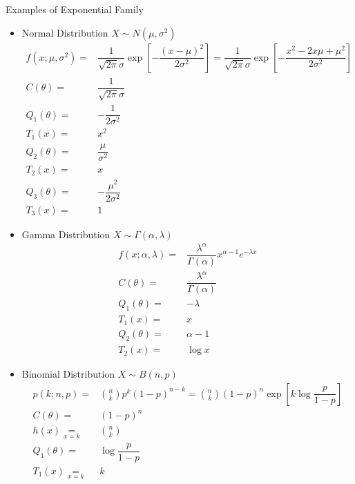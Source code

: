    
\begin{point}
    Examples of Exponential Family
\end{point}
\begin{itemize}[topsep=2pt,itemsep=0pt]
    \item Normal Distribution $ X\sim N(\mu ,\sigma ^2) $
    \begin{align*}
        f(x;\mu ,\sigma ^2)=&\dfrac{1}{\sqrt{2\pi}\sigma }\exp\left[ -\dfrac{(x-\mu )^2}{2\sigma ^2} \right]=\dfrac{1}{\sqrt{2\pi}\sigma }\exp\left[ -\dfrac{x^2-2x\mu +\mu ^2}{2\sigma ^2} \right]\\
        C(\theta )=&\dfrac{1}{\sqrt{2\pi}\sigma }\\
        Q_1(\theta )=&-\dfrac{1}{2\sigma ^2}\\
        T_1(x)=&x^2\\
        Q_2(\theta )=&\dfrac{\mu }{\sigma ^2}\\
        T_2(x)=&x\\
        Q_3(\theta )=&-\dfrac{\mu ^2}{2\sigma ^2}\\
        T_3(x)=&1
    \end{align*}
    \item Gamma Distribution $ X\sim \Gamma (\alpha ,\lambda ) $
    \begin{align*}
        f(x;\alpha ,\lambda )=&\dfrac{\lambda ^\alpha }{\Gamma (\alpha )}x^{\alpha -1}e^{-\lambda x}\\
        C(\theta )=&\dfrac{\lambda ^\alpha }{\Gamma (\alpha )}\\
        Q_1(\theta )=&-\lambda \\
        T_1(x)=&x\\
        Q_2(\theta )=&\alpha -1\\
        T_2(x)=&\log x
    \end{align*}
    \item Binomial Distribution $ X\sim B(n,p) $
    \begin{align*}
        p(k;n,p)=&\binom{n}{k}p^k(1-p)^{n-k}=\binom{n}{k}(1-p)^n\exp\left[ k\log\dfrac{p }{1-p} \right]\\
        C(\theta )=&(1-p)^n\\
        h(x)\mathop{=}\limits_{x=k} &\binom{n}{k}\\
        Q_1(\theta )=&\log\dfrac{p}{1-p}\\
        T_1(x)\mathop{=}\limits_{x=k}&k 
    \end{align*}
    
    
\end{itemize}

